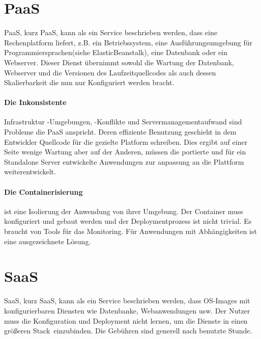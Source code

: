 \documentclass[
12pt,
english,
ngerman,
headsepline,
twoside,
openright,
numbers=noenddot,version=first
]{scrreprt}
\begin{document}
\section{PaaS}
\label{sec:paas}
\acrfull{PaaS}, kurz \acrshort{PaaS}, kann als ein Service beschrieben werden, dass eine Rechenplatform liefert, z.B. ein Betriebssystem, eine Ausführungsumgebung für Programmiersprachen(siehe ElasticBeanstalk), eine Datenbank oder ein Webserver. Dieser Dienst übernimmt sowohl die Wartung der Datenbank, Webserver und die Versionen des Laufzeitquellcodes als auch dessen Skalierbarkeit die nun nur Konfiguriert werden bracht\cite{patternAWS}.

\paragraph{Die Inkonsistente} Infrastruktur -Umgebungen, -Konflikte und Servermanagementaufwand sind Probleme die \ac{PaaS} anspricht. Deren effiziente Benutzung geschieht in dem Entwickler Quellcode für die gezielte Platform schreiben. Dies ergibt auf einer Seite wenige Wartung aber auf der Anderen, müssen die portierte und für ein Standalone Server entwickelte Anwendungen zur anpassung an die Plattform weiterentwickelt.
\paragraph{Die Containerisierung} ist eine Isolierung der Anwendung von ihrer Umgebung. Der Container muss konfiguriert und gebaut werden und der Deploymentprozess ist nicht trivial. Es braucht von Tools für das Monitoring. Für Anwendungen mit Abhängigkeiten ist eine ausgezeichnete Lösung. 

\section{SaaS} 
\label{sec:saas}
\acrfull{SaaS}, kurz \acrshort{SaaS}, kann als ein Service beschrieben werden, dass OS-Images mit konfigurierbaren Diensten wie Datenbanke, Webanwendungen usw. Der Nutzer muss die Konfiguration und Deployment nicht lernen, um die Dienste in einen größeren \glqq Stack\grqq\ einzubinden. Die Gebühren sind generell nach benutzte Stunde. 
\end{document}
